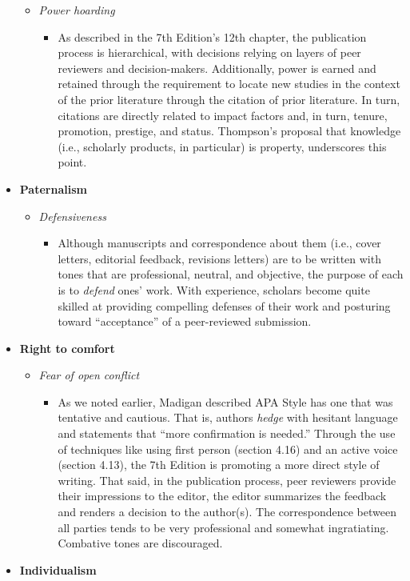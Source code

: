 \documentclass[
  11pt,
]{book}
\providecommand{\tightlist}{%
  \setlength{\itemsep}{0pt}\setlength{\parskip}{0pt}}
\begin{document}
\begin{itemize}
  \begin{itemize}
  \tightlist
  \item
    \emph{Power hoarding}

    \begin{itemize}
    \tightlist
    \item
      As described in the 7th Edition's 12th chapter, the publication process is hierarchical, with decisions relying on layers of peer reviewers and decision-makers. Additionally, power is earned and retained through the requirement to locate new studies in the context of the prior literature through the citation of prior literature. In turn, citations are directly related to impact factors and, in turn, tenure, promotion, prestige, and status. Thompson's \citeyearpar{thompson_gentlemanly_2004} proposal that knowledge (i.e., scholarly products, in particular) is property, underscores this point.
    \end{itemize}
  \end{itemize}
\item
  \textbf{Paternalism}

  \begin{itemize}
  \tightlist
  \item
    \emph{Defensiveness}

    \begin{itemize}
    \tightlist
    \item
      Although manuscripts and correspondence about them (i.e., cover letters, editorial feedback, revisions letters) are to be written with tones that are professional, neutral, and objective, the purpose of each is to \emph{defend} ones' work. With experience, scholars become quite skilled at providing compelling defenses of their work and posturing toward ``acceptance'' of a peer-reviewed submission.
    \end{itemize}
  \end{itemize}
\item
  \textbf{Right to comfort}

  \begin{itemize}
  \tightlist
  \item
    \emph{Fear of open conflict}

    \begin{itemize}
    \tightlist
    \item
      As we noted earlier, Madigan \citeyearpar{madigan_language_1995} described APA Style has one that was tentative and cautious. That is, authors \emph{hedge} with hesitant language and statements that ``more confirmation is needed.'' Through the use of techniques like using first person (section 4.16) and an active voice (section 4.13), the 7th Edition is promoting a more direct style of writing. That said, in the publication process, peer reviewers provide their impressions to the editor, the editor summarizes the feedback and renders a decision to the author(s). The correspondence between all parties tends to be very professional and somewhat ingratiating. Combative tones are discouraged.
    \end{itemize}
  \end{itemize}
\item
  \textbf{Individualism}


\end{itemize}
\end{document}
